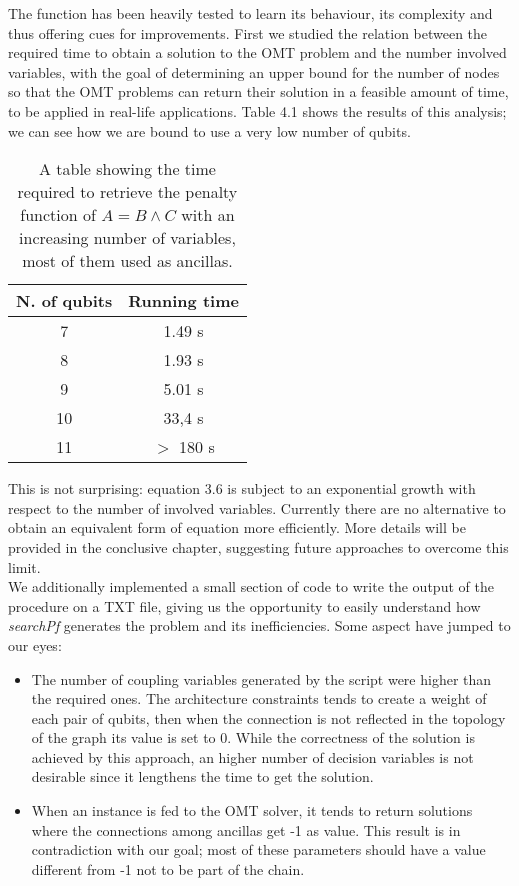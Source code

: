 The function has been heavily tested to learn its behaviour, its complexity and thus offering cues for improvements. First we studied the relation between the required time to obtain a solution to the OMT problem and the number involved variables, with the goal of determining an upper bound for the number of nodes so that the OMT problems can return their solution in a feasible amount of time, to be applied in real-life applications. Table 4.1 shows the results of this analysis; we can see how we are bound to use a very low number of qubits.
\begin{table}[]
\centering
\begin{tabular}{|c|c|}
\hline
\rowcolor[HTML]{FFCC67} 
N. of qubits & Running time \\ \hline
7            & 1.49 s       \\ \hline
8            & 1.93 s       \\ \hline
9            & 5.01 s       \\ \hline
10           & 33,4 s       \\ \hline
11           & $>$ 180 s      \\ \hline
\end{tabular}
\caption{A table showing the time required to retrieve the penalty function of $A = B \wedge C$ with an increasing number of variables, most of them used as ancillas.}
\label{tab:my-table}
\end{table}
This is not surprising: equation 3.6 is subject to an exponential growth with respect to the number of involved variables. Currently there are no alternative to obtain an equivalent form of equation more efficiently. More details will be provided in the conclusive chapter, suggesting future approaches to overcome this limit. \\
We additionally implemented a small section of code to write the output of the procedure on a TXT file, giving us the opportunity to easily understand how \textit{searchPf} generates the problem and its inefficiencies. Some aspect have jumped to our eyes:

\begin{itemize}
    \item The number of coupling variables generated by the script were higher than the required ones. The architecture constraints tends to create a weight of each pair of qubits, then when the connection is not reflected in the topology of the graph its value is set to 0. While the correctness of the solution is achieved by this approach, an higher number of decision variables is not desirable since it lengthens the time to get the solution.
    \item When an instance is fed to the OMT solver, it tends to return solutions where the connections among ancillas get -1 as value. This result is in contradiction with our goal; most of these parameters should have a value different from -1 not to be part of the chain.
\end{itemize}

\newpage

